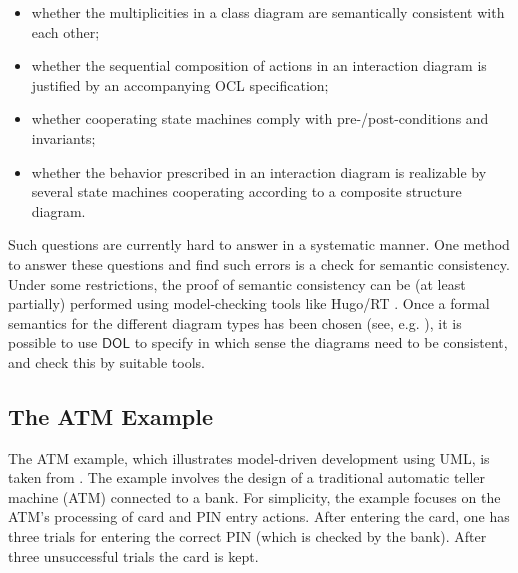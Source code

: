 \documentclass[10pt,fleqn,final]{scrreprt}
\newcommand*{\DOL}{\ensuremath{\mathsf{DOL}}\xspace}
\newcommand{\ssclause}[1]{\subsection{#1}}
\newenvironment{definitions}[0]{\medskip }{}
\begin{document}
\begin{definitions}
\begin{itemize}
\item whether the multiplicities in a class diagram are semantically consistent with each other;
\item	  whether the sequential composition of actions in an interaction diagram is justified by an accompanying OCL specification;
\item 	whether cooperating state machines comply with pre-/post-conditions and invariants;
\item 	whether the behavior prescribed in an interaction diagram is realizable by several state machines cooperating according to a composite structure diagram.
\end{itemize}
Such questions are currently hard to answer in a systematic manner. One method to answer these questions and find such errors is a check for semantic 
consistency. Under some restrictions, the proof of semantic consistency can be (at least partially) performed using model-checking tools like Hugo/RT \cite{knapp-wuttke:models06wsh:2007}. 
Once a formal semantics for the different diagram types has been chosen (see, e.g. \cite{knapp-mossakowski-roggenbach:corr:2014}), it is possible to use \DOL to specify in which 
sense the diagrams need to be consistent, and check this by suitable tools.


\ssclause{The ATM Example}
\label{sec:atm-example}

 The ATM example, which illustrates model-driven development using UML,
is taken from \cite{knapp-mossakowski-roggenbach:corr:2014}.  The example involves
the design of a traditional automatic teller machine (ATM) connected
to a bank. For simplicity,  the example focuses
 on the ATM's processing of card and PIN entry actions.  
After entering the card, one has three
trials for entering the correct PIN (which is checked by the
bank). After three unsuccessful trials the card is kept.


\end{definitions}
\end{document}
